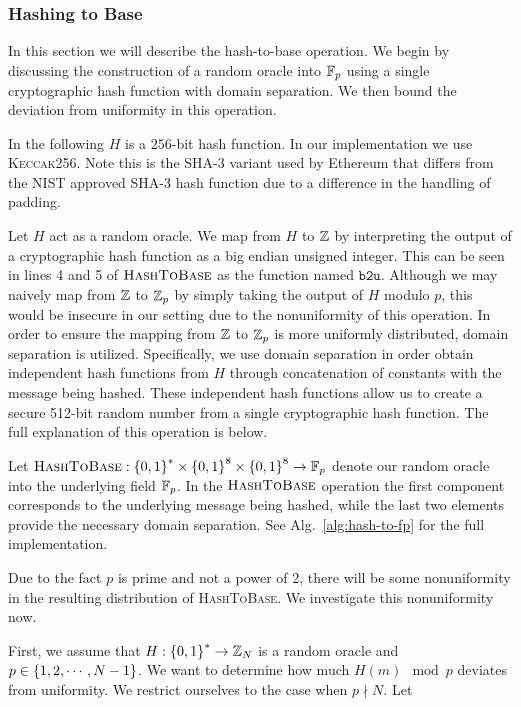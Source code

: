 \subsubsection{Hashing to Base}
\label{sssec:hash-to-base}

In this section we will describe the hash-to-base operation.
We begin by discussing the construction of a random oracle into
$\mathbb{F}_{p}$ using a single cryptographic hash function with
domain separation.
We then bound the deviation from uniformity in this operation.

In the following $H$ is a $256$-bit hash function.
In our implementation we use \textsc{Keccak256}.
Note this is the \textsc{SHA}-3 variant used by Ethereum
that differs from the NIST approved \textsc{SHA}-3 hash function due to a
difference in the handling of padding.

Let $H$ act as a random oracle.
We map from $H$ to $\mathbb{Z}$ by interpreting the output of a
cryptographic hash function as a big endian unsigned integer.
This can be seen in lines 4 and 5 of $\textsc{HashToBase}$
as the function named $\texttt{b2u}$.
Although we may naively map from $\mathbb{Z}$ to $\mathbb{Z}_{p}$ by simply taking the
output of $H$ modulo $p$, this would be insecure in our setting due to the
nonuniformity of this operation.
In order to ensure the mapping from $\mathbb{Z}$ to $\mathbb{Z}_{p}$ is more
uniformly distributed, domain separation is utilized.
Specifically, we use domain separation in order obtain independent hash
functions from $H$ through concatenation of constants with the message being
hashed.
These independent hash functions allow us to create a secure 512-bit random
number from a single cryptographic hash function.
The full explanation of this operation is below.

Let $\textsc{HashToBase}:\left\{ 0,1 \right\}^{*}\times\left\{ 0,1 \right\}^{8}\times
\left\{ 0,1 \right\}^{8}\to\mathbb{F}_{p}$ denote our random oracle into the
underlying field $\mathbb{F}_{p}$.
In the $\textsc{HashToBase}$ operation the first component corresponds to the
underlying message being hashed, while the last two elements provide the
necessary domain separation.
See Alg.~\ref{alg:hash-to-fp} for the full implementation.

Due to the fact $p$ is prime and not a power of 2, there will be some
nonuniformity in the resulting distribution of \textsc{HashToBase}.
We investigate this nonuniformity now.

First, we assume that $H:\left\{ 0,1 \right\}^{*}\to\mathbb{Z}_{N}$
is a random oracle and $p\in\left\{ 1,2,\cdots,N-1 \right\}$.
We want to determine how much $H(m)\mod p$ deviates from uniformity.
We restrict ourselves to the case when $p\nmid N$.
Let

